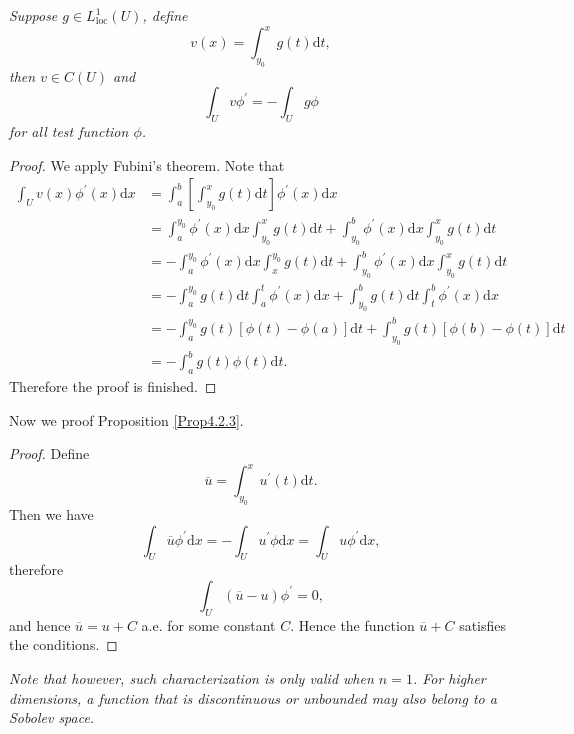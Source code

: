 \begin{lemma}\em
Suppose $g\in L_{\mathrm{loc}}^1(U)$, define 
$$
v\left( x \right) =\int_{y_0}^x{g\left( t \right) \mathrm{d}t},
$$
then $v\in C(U)$ and 
$$
\int_U{v\phi ^{\prime}}=-\int_U{g\phi}
$$
for all test function $\phi$.
\end{lemma}
\begin{proof}
We apply Fubini's theorem. Note that 
$$
\begin{aligned}
\int_U{v\left( x \right) \phi ^{\prime}\left( x \right) \mathrm{d}x}&=\int_a^b{\left[ \int_{y_0}^x{g\left( t \right) \mathrm{d}t} \right] \phi ^{\prime}\left( x \right) \mathrm{d}x}
\\
&=\int_a^{y_0}{\phi ^{\prime}\left( x \right) \mathrm{d}x\int_{y_0}^x{g\left( t \right) \mathrm{d}t}}+\int_{y_0}^b{\phi ^{\prime}\left( x \right) \mathrm{d}x\int_{y_0}^x{g\left( t \right) \mathrm{d}t}}
\\
&=-\int_a^{y_0}{\phi ^{\prime}\left( x \right) \mathrm{d}x\int_x^{y_0}{g\left( t \right) \mathrm{d}t}}+\int_{y_0}^b{\phi ^{\prime}\left( x \right) \mathrm{d}x\int_{y_0}^x{g\left( t \right) \mathrm{d}t}}
\\
&=-\int_a^{y_0}{g\left( t \right) \mathrm{d}t\int_a^t{\phi ^{\prime}\left( x \right) \mathrm{d}x}}+\int_{y_0}^b{g\left( t \right) \mathrm{d}t\int_t^b{\phi ^{\prime}\left( x \right) \mathrm{d}x}}
\\
&=-\int_a^{y_0}{g\left( t \right) \left[ \phi \left( t \right) -\phi \left( a \right) \right] \mathrm{d}t}+\int_{y_0}^b{g\left( t \right) \left[ \phi \left( b \right) -\phi \left( t \right) \right] \mathrm{d}t}
\\
&=-\int_a^b{g\left( t \right) \phi \left( t \right) \mathrm{d}t}.
\end{aligned}
$$
Therefore the proof is finished.
\end{proof}
Now we proof Proposition \ref{Prop4.2.3}.
\begin{proof}
Define 
$$
\overline{u}=\int_{y_0}^x{u^{\prime}\left( t \right) \mathrm{d}t}.
$$
Then we have 
$$
\int_U{\overline{u}\phi ^{\prime}\mathrm{d}x}=-\int_U{u^{\prime}\phi \mathrm{d}x}=\int_U{u\phi ^{\prime}\mathrm{d}x},
$$
therefore 
$$
\int_U{\left( \overline{u}-u \right) \phi ^{\prime}}=0,
$$
and hence $\overline{u}=u+C$ a.e. for some constant $C$. Hence the function $\overline{u}+C$ satisfies the conditions.
\end{proof}
\begin{note}\em
Note that however, such characterization is only valid when $n=1$. For higher dimensions, a function that is discontinuous or unbounded may also belong to a Sobolev space.
\end{note}
